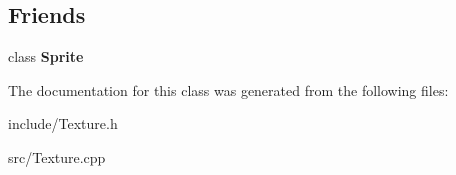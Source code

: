 \subsection*{Friends}
\begin{DoxyCompactItemize}
\item 
\hypertarget{classsdl_1_1Texture_a3292175d54d93d126ba2829249316344}{class {\bfseries Sprite}}\label{classsdl_1_1Texture_a3292175d54d93d126ba2829249316344}

\end{DoxyCompactItemize}


The documentation for this class was generated from the following files\-:\begin{DoxyCompactItemize}
\item 
include/Texture.\-h\item 
src/Texture.\-cpp\end{DoxyCompactItemize}
